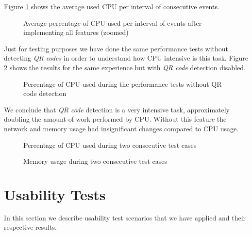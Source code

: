    Figure \ref{fig:summary_full_cpu} shows the average used \ac{CPU} per interval of consecutive events. 

\begin{figure}[!htb]
  \begin{center}
    
  \end{center}
  \caption{Average percentage of CPU used per interval of events after implementing all features (zoomed)}
  \label{fig:summary_full_cpu}
\end{figure}

  Just for testing purposes we have done the same performance tests without detecting \emph{QR codes} in order to understand how \ac{CPU} intensive is this task. Figure \ref{fig:test_without_qrcode_cpu} shows the results for the same experience but with \emph{QR code} detection disabled.

  \begin{figure}[!htb]
  \begin{center}
    
  \end{center}
  \caption{Percentage of CPU used during the performance tests without QR code detection}
  \label{fig:test_without_qrcode_cpu}
\end{figure}

We conclude that \emph{QR code} detection is a very intensive task, approximately doubling the amount of work performed by \ac{CPU}. Without this feature the network and memory usage had insignificant changes compared to \ac{CPU} usage.



  \begin{figure}[!htb]
  \begin{center}
    
  \end{center}
  \caption{Percentage of CPU used during two consecutive test cases}
  \label{fig:test_two_times_cpu}
\end{figure}


\begin{figure}[!htb]
  \begin{center}
    
  \end{center}
  \caption{Memory usage during two consecutive test cases}
  \label{fig:test_two_times_mem}
\end{figure}

\section {Usability Tests}
     In this section we describe usability test scenarios that we have applied and their respective results.



